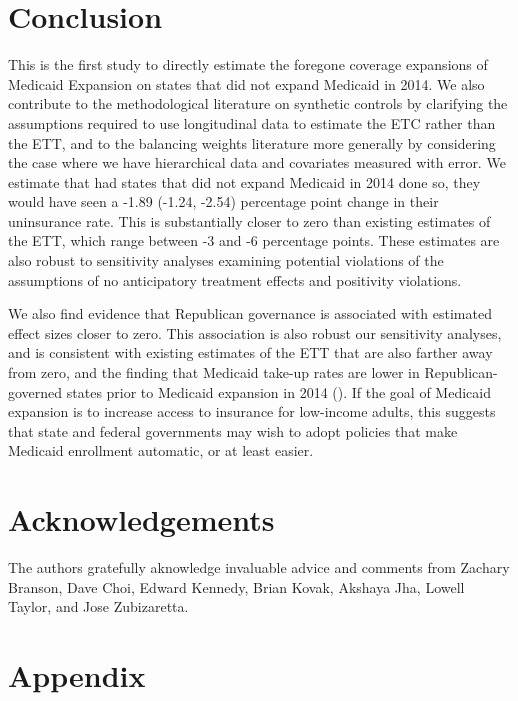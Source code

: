 \documentclass[12pt]{article}
\begin{document}
\section{Conclusion}

This is the first study to directly estimate the foregone coverage expansions of Medicaid Expansion on states that did not expand Medicaid in 2014. We also contribute to the methodological literature on synthetic controls by clarifying the assumptions required to use longitudinal data to estimate the ETC rather than the ETT, and to the balancing weights literature more generally by considering the case where we have hierarchical data and covariates measured with error. We estimate that had states that did not expand Medicaid in 2014 done so, they would have seen a -1.89 (-1.24, -2.54) percentage point change in their uninsurance rate. This is substantially closer to zero than existing estimates of the ETT, which range between -3 and -6 percentage points. These estimates are also robust to sensitivity analyses examining potential violations of the assumptions of no anticipatory treatment effects and positivity violations. 

We also find evidence that Republican governance is associated with estimated effect sizes closer to zero. This association is also robust our sensitivity analyses, and is consistent with existing estimates of the ETT that are also farther away from zero, and the finding that Medicaid take-up rates are lower in Republican-governed states prior to Medicaid expansion in 2014 (\cite{sommers2012understanding}). If the goal of Medicaid expansion is to increase access to insurance for low-income adults, this suggests that state and federal governments may wish to adopt policies that make Medicaid enrollment automatic, or at least easier.

\section{Acknowledgements}

The authors gratefully aknowledge invaluable advice and comments from Zachary Branson, Dave Choi, Edward Kennedy, Brian Kovak, Akshaya Jha, Lowell Taylor, and Jose Zubizaretta.

\cleardoublepage
 

\cleardoublepage

\section{Appendix}
\end{document}
